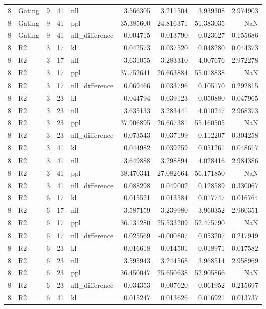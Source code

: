 \begin{tabular}{rlrrlrrrr}
8 & Gating & 9 & 41 & nll & 3.566305 & 3.211504 & 3.939308 & 2.974903 \\
8 & Gating & 9 & 41 & ppl & 35.385600 & 24.816371 & 51.383035 & NaN \\
8 & Gating & 9 & 41 & nll_difference & 0.004715 & -0.013790 & 0.023627 & 0.155686 \\
8 & R2 & 3 & 17 & kl & 0.042573 & 0.037520 & 0.048280 & 0.044373 \\
8 & R2 & 3 & 17 & nll & 3.631055 & 3.283310 & 4.007676 & 2.972278 \\
8 & R2 & 3 & 17 & ppl & 37.752641 & 26.663884 & 55.018838 & NaN \\
8 & R2 & 3 & 17 & nll_difference & 0.069466 & 0.033796 & 0.105170 & 0.292815 \\
8 & R2 & 3 & 23 & kl & 0.044794 & 0.039123 & 0.050880 & 0.047965 \\
8 & R2 & 3 & 23 & nll & 3.635133 & 3.283441 & 4.010247 & 2.968373 \\
8 & R2 & 3 & 23 & ppl & 37.906895 & 26.667381 & 55.160505 & NaN \\
8 & R2 & 3 & 23 & nll_difference & 0.073543 & 0.037199 & 0.112207 & 0.304258 \\
8 & R2 & 3 & 41 & kl & 0.044982 & 0.039259 & 0.051261 & 0.048617 \\
8 & R2 & 3 & 41 & nll & 3.649888 & 3.298894 & 4.028416 & 2.984386 \\
8 & R2 & 3 & 41 & ppl & 38.470341 & 27.082664 & 56.171850 & NaN \\
8 & R2 & 3 & 41 & nll_difference & 0.088298 & 0.049002 & 0.128589 & 0.330067 \\
8 & R2 & 6 & 17 & kl & 0.015521 & 0.013584 & 0.017747 & 0.016764 \\
8 & R2 & 6 & 17 & nll & 3.587159 & 3.239980 & 3.960352 & 2.960351 \\
8 & R2 & 6 & 17 & ppl & 36.131280 & 25.533209 & 52.475790 & NaN \\
8 & R2 & 6 & 17 & nll_difference & 0.025569 & -0.000807 & 0.053207 & 0.217949 \\
8 & R2 & 6 & 23 & kl & 0.016618 & 0.014501 & 0.018971 & 0.017582 \\
8 & R2 & 6 & 23 & nll & 3.595943 & 3.244568 & 3.968514 & 2.958969 \\
8 & R2 & 6 & 23 & ppl & 36.450047 & 25.650638 & 52.905866 & NaN \\
8 & R2 & 6 & 23 & nll_difference & 0.034353 & 0.007620 & 0.061952 & 0.215697 \\
8 & R2 & 6 & 41 & kl & 0.015247 & 0.013626 & 0.016921 & 0.013737 \\

\end{tabular}
